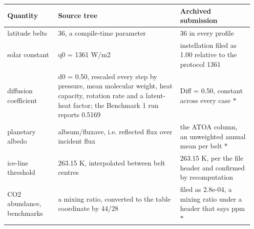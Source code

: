 \footnotesize
\begin{tabular}{p{2.6cm}p{5.6cm}p{6.2cm}}
\toprule
Quantity & Source tree & Archived submission \\
\midrule
latitude belts & 36, a compile-time parameter & 36 in every profile \\
solar constant & q0 = 1361 W/m2 & instellation filed as 1.00 relative to the protocol 1361 \\
diffusion coefficient & d0 = 0.50, rescaled every step by pressure, mean molecular weight, heat capacity, rotation rate and a latent-heat factor; the Benchmark 1 run reports 0.5169 & Diff = 0.50, constant across every case $\ast$ \\
planetary albedo & albsum/fluxave, i.e. reflected flux over incident flux & the ATOA column, an unweighted annual mean per belt $\ast$ \\
ice-line threshold & 263.15 K, interpolated between belt centres & 263.15 K, per the file header and confirmed by recomputation \\
CO2 abundance, benchmarks & a mixing ratio, converted to the table coordinate by 44/28 & filed as 2.8e-04, a mixing ratio under a header that says ppm $\ast$ \\
\bottomrule
\end{tabular}
